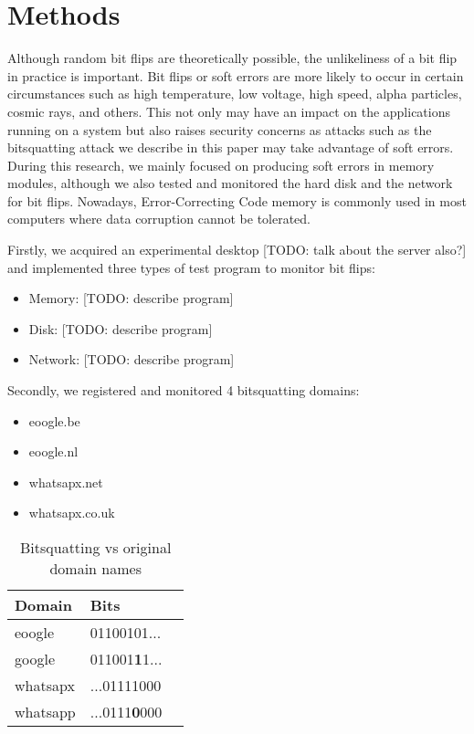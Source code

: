 \documentclass[conference]{IEEEtran}
\begin{document}
\section{Methods}\label{sec:method}

Although random bit flips are theoretically possible, the unlikeliness of a bit flip in
practice is important. Bit flips or soft errors are more likely to occur in certain
circumstances such as high temperature, low voltage, high speed, alpha
particles, cosmic rays, and others. This not only may have an impact on the
applications running on a system but also raises security concerns as attacks
such as the bitsquatting attack we describe in this paper may take advantage of
soft errors. During this research, we mainly focused on producing soft errors
in memory modules, although we also tested and monitored the hard disk and the network for
bit flips. Nowadays, Error-Correcting Code memory is commonly used in most
computers where data corruption cannot be tolerated.

Firstly, we acquired an experimental desktop [TODO: talk about the server also?] and implemented three types of test program to monitor bit flips:

\begin{itemize}
  \item Memory: [TODO: describe program]
  \item Disk: [TODO: describe program]
  \item Network: [TODO: describe program]
\end{itemize}

Secondly, we registered and monitored 4 bitsquatting domains:

\begin{itemize}
  \item eoogle.be
  \item eoogle.nl
  \item whatsapx.net
  \item whatsapx.co.uk
\end{itemize}

\begin{table}[H]
  \centering
  \caption{Bitsquatting vs original domain names}
  \label{table-bits}
  \begin{tabular}{|l|l|l|}
    \hline
    \textbf{Domain}   & \textbf{Bits} \\ \hline
    eoogle   & 01100101... \\ \hline
    google   & 011001\textbf{1}1... \\ \hline
    whatsapx & ...01111000 \\ \hline
    whatsapp & ...0111\textbf{0}000 \\ \hline
   \end{tabular}
\end{table}
\end{document}
